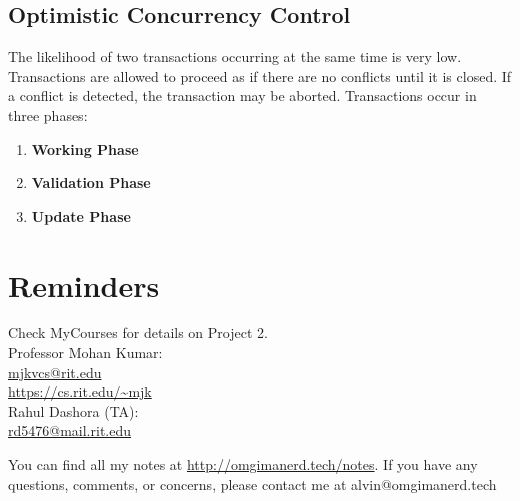\documentclass{math}
\begin{document}
\subsection*{Optimistic Concurrency Control}
The likelihood of two transactions occurring at the same time is very low.
Transactions are allowed to proceed as if there are no conflicts until it is
closed. If a conflict is detected, the transaction may be aborted. Transactions
occur in three phases:
\begin{enumerate}
  \item \textbf{Working Phase}
  \item \textbf{Validation Phase}
  \item \textbf{Update Phase}
\end{enumerate}

\section*{Reminders}
Check MyCourses for details on Project 2. \\
\noindent Professor Mohan Kumar: \\
\url{mjkvcs@rit.edu} \\
\url{https://cs.rit.edu/~mjk} \\

\noindent Rahul Dashora (TA): \\
\url{rd5476@mail.rit.edu} \\

\begin{center}
  You can find all my notes at \url{http://omgimanerd.tech/notes}. If you have
  any questions, comments, or concerns, please contact me at
  alvin@omgimanerd.tech
\end{center}
\end{document}

